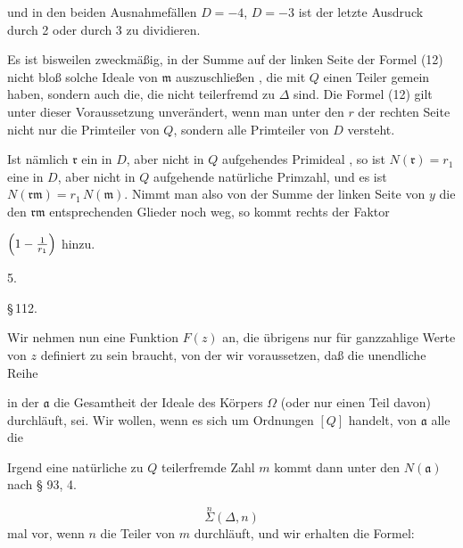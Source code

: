 
und in den beiden Ausnahmefällen $D=-4$, $D=-3$ ist der
letzte Ausdruck durch 2 oder durch 3 zu dividieren.


Es ist bisweilen zweckmäßig, in der Summe auf der linken
Seite der Formel (12) nicht bloß solche Ideale von $\mathfrak{m}$ auszuschließen
, die mit $Q$ einen Teiler gemein haben, sondern auch
die, die nicht teilerfremd zu $\varDelta$ sind. Die Formel (12) gilt unter
dieser Voraussetzung unverändert, wenn man unter den $r$ der
rechten Seite nicht nur die Primteiler von $Q$, sondern alle Primteiler
 von $D$ versteht.

Ist nämlich $\mathfrak{r}$ ein in $D$, aber nicht in $Q$ aufgehendes Primideal
, so ist $N(\mathfrak{r}) = r_1$ eine in $D$, aber nicht in $Q$ aufgehende
natürliche Primzahl, und es ist $N(\mathfrak{r}\mathfrak{m}) = r_1\,N(\mathfrak{m})$. Nimmt man
also von der Summe der linken Seite von $y$ die den $\mathfrak{r}\mathfrak{m}$ entsprechenden %
 Glieder noch weg, so kommt rechts der Faktor

$\Bigl(1 - \frac{1}{r_1}\Bigr)$ hinzu.

5. 

\begin{center}
\S\,112. 
\end{center}

Wir nehmen nun eine Funktion $F(z)$ an, die übrigens nur
für ganzzahlige Werte von $z$ definiert zu sein braucht, von der
wir voraussetzen, daß die unendliche Reihe

in der $\mathfrak{a}$ die Gesamtheit der Ideale des Körpers $\Omega$ (oder nur
einen Teil davon) durchläuft,  sei. Wir
wollen, wenn es sich um Ordnungen $[Q]$ handelt, von $\mathfrak{a}$ alle die

Irgend eine natürliche zu $Q$ teilerfremde Zahl $m$ kommt
dann unter den $N(\mathfrak{a})$ nach § 93, 4.

\[ \overset{n}{\Sigma} (\varDelta, n) \]
mal vor, wenn $n$ die Teiler von $m$ durchläuft, und wir erhalten
die Formel:


